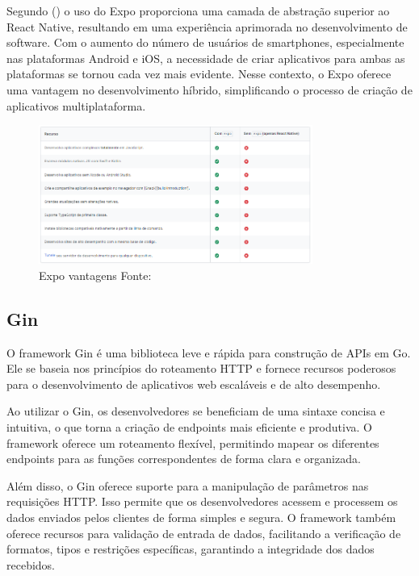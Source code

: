 Segundo (\textcite{Hugo}) o uso do Expo proporciona uma camada de abstração superior ao React Native, resultando em uma experiência aprimorada no desenvolvimento de software. Com o aumento do 
número de usuários de smartphones, especialmente nas plataformas Android e iOS, a necessidade de criar aplicativos para ambas as plataformas se tornou cada vez mais 
evidente. Nesse contexto, o Expo oferece uma vantagem no desenvolvimento híbrido, simplificando o processo de criação de aplicativos multiplataforma.

\begin{figure}[htb]
	\caption{\label{fig:Fig_1}Expo vantagens Fonte: \cite{Expo}}
	\begin{center}
		\includegraphics[width=0.8\textwidth]{images/expo.png}
	\end{center}
\end{figure}

\subsection{Gin}
O framework Gin é uma biblioteca leve e rápida para construção de APIs em Go. Ele se baseia nos princípios do roteamento HTTP e fornece recursos poderosos para o desenvolvimento de aplicativos web escaláveis e de alto desempenho.

Ao utilizar o Gin, os desenvolvedores se beneficiam de uma sintaxe concisa e intuitiva, o que torna a criação de endpoints mais eficiente e produtiva. O framework oferece um roteamento flexível, permitindo mapear os diferentes endpoints para as funções correspondentes de forma clara e organizada.

Além disso, o Gin oferece suporte para a manipulação de parâmetros nas requisições HTTP. Isso permite que os desenvolvedores acessem e processem os dados enviados pelos clientes de forma simples e segura. O framework também oferece recursos para validação de entrada de dados, facilitando a verificação de formatos, tipos e restrições específicas, garantindo a integridade dos dados recebidos.

